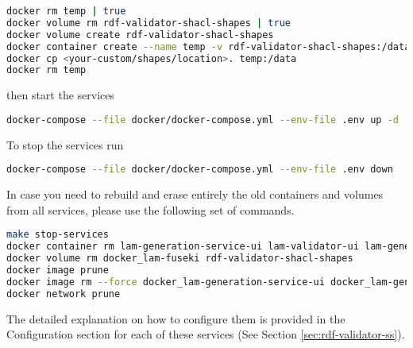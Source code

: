 \begin{lstlisting}[language=bash,]
docker rm temp | true
docker volume rm rdf-validator-shacl-shapes | true
docker volume create rdf-validator-shacl-shapes
docker container create --name temp -v rdf-validator-shacl-shapes:/data busybox
docker cp <your-custom/shapes/location>. temp:/data
docker rm temp
\end{lstlisting}

then start the services

\begin{lstlisting}[language=bash,]
docker-compose --file docker/docker-compose.yml --env-file .env up -d
\end{lstlisting}

To stop the services run

\begin{lstlisting}[language=bash,]
docker-compose --file docker/docker-compose.yml --env-file .env down
\end{lstlisting}

In case you need to rebuild and erase entirely the old containers and volumes from all services, please use the following set of commands.

\begin{lstlisting}[language=bash,]
make stop-services
docker container rm lam-generation-service-ui lam-validator-ui lam-generation-service-api lam-validator-api lam-fuseki
docker volume rm docker_lam-fuseki rdf-validator-shacl-shapes
docker image prune
docker image rm --force docker_lam-generation-service-ui docker_lam-generation-service-api docker_lam-validator-ui docker_lam-validator-api
docker network prune
\end{lstlisting}

The detailed explanation on how to configure them is provided in the Configuration section for each of these services (See Section \ref{sec:rdf-validator-ss}).
